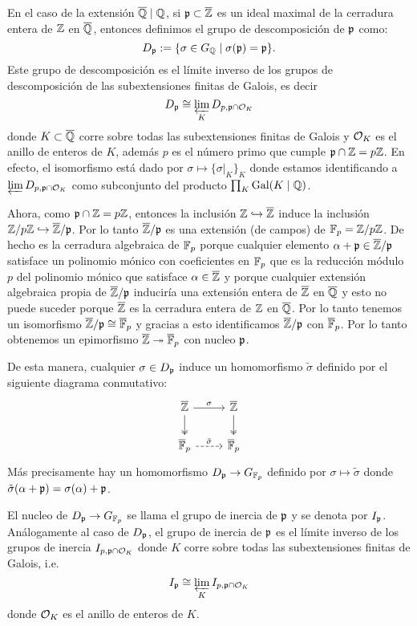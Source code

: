 En el caso de la extensi\'on $\overline{\mathbb{Q}}\mid\mathbb{Q}$, si $\mathfrak{p}\subset\overline{\mathbb{Z}}$ es un ideal maximal de la cerradura entera de $\mathbb{Z}$ en $\overline{\mathbb{Q}}$, entonces definimos el grupo de descomposici\'on de $\mathfrak{p}$ como:
\[
  D_{\mathfrak{p}}:=\{\sigma\in G_{\mathbb{Q}}\mid \sigma(\mathfrak{p})=\mathfrak{p}\}.
\]
Este grupo de descomposici\'on es el l\'imite inverso de los grupos de descomposici\'on de las subextensiones finitas de Galois, es decir
\[
  D_{\mathfrak{p}}\cong \varprojlim_{K}D_{p,\mathfrak{p}\cap\mathcal{O}_K}
\]
donde $K\subset\overline{\mathbb{Q}}$ corre sobre todas las subextensiones finitas de Galois y $\mathcal{O}_K$ es el anillo de enteros de $K$, adem\'as $p$ es el n\'umero primo que cumple $\mathfrak{p}\cap\mathbb{Z}=p\mathbb{Z}$. En efecto, el isomorfismo est\'a dado por $\sigma\mapsto \{\sigma|_K\}_{K}$ donde estamos identificando a $\varprojlim D_{p,\mathfrak{p}\cap\mathcal{O}_K}$ como subconjunto del producto $\prod_K\text{Gal}(K\mid\mathbb{Q})$.

Ahora, como $\mathfrak{p}\cap\mathbb{Z}=p\mathbb{Z}$, entonces la inclusi\'on $\mathbb{Z}\hookrightarrow\overline{\mathbb{Z}}$ induce la inclusi\'on $\mathbb{Z}/p\mathbb{Z} \hookrightarrow\overline{\mathbb{Z}}/\mathfrak{p}$. Por lo tanto $\overline{\mathbb{Z}}/\mathfrak{p}$ es una extensi\'on (de campos) de $\mathbb{F}_p=\mathbb{Z}/p\mathbb{Z}$. De hecho es la cerradura algebraica de $\mathbb{F}_p$ porque cualquier elemento $\alpha+\mathfrak{p}\in\overline{\mathbb{Z}}/\mathfrak{p}$ satisface un polinomio m\'onico con coeficientes en $\mathbb{F}_p$ que es la reducci\'on m\'odulo $p$ del polinomio m\'onico que satisface $\alpha\in\overline{\mathbb{Z}}$ y porque cualquier extensi\'on algebraica propia de $\overline{\mathbb{Z}}/\mathfrak{p}$ inducir\'ia una extensi\'on entera de $\overline{\mathbb{Z}}$ en $\overline{\mathbb{Q}}$ y esto no puede suceder porque $\overline{\mathbb{Z}}$ es la cerradura entera de $\mathbb{Z}$ en $\overline{\mathbb{Q}}$. Por lo tanto tenemos un isomorfismo $\overline{\mathbb{Z}}/\mathfrak{p}\cong\overline{\mathbb{F}}_p$ y gracias a esto identificamos $\overline{\mathbb{Z}}/\mathfrak{p}$ con $\overline{\mathbb{F}}_p$. Por lo tanto obtenemos un epimorfismo $\overline{\mathbb{Z}}\twoheadrightarrow\overline{\mathbb{F}}_p$ con nucleo $\mathfrak{p}$.

De esta manera, cualquier $\sigma\in D_{\mathfrak{p}}$ induce un homomorfismo $\tilde{\sigma}$ definido por el siguiente diagrama conmutativo:
\[
  \begin{tikzcd}
    \ol{\ZZ} \arrow[d,two heads] \arrow[r,"\sigma"] & \ol{\ZZ} \arrow[d,two heads]\\
    \ol{\FF}_p \arrow[r,dashed,"\tilde{\sigma}"]& \ol{\FF}_p
  \end{tikzcd}
\]
M\'as precisamente hay un homomorfismo $D_{\mathfrak{p}}\rightarrow G_{\mathbb{F}_p}$ definido por $\sigma\mapsto\tilde{\sigma}$ donde $\tilde{\sigma}(\alpha+\mathfrak{p})=\sigma(\alpha)+\mathfrak{p}$.

El nucleo de $D_{\mathfrak{p}}\rightarrow G_{\mathbb{F}_p}$ se llama el grupo de inercia de $\mathfrak{p}$ y se denota por $I_{\mathfrak{p}}$. An\'alogamente al caso de $D_{\mathfrak{p}}$, el grupo de inercia de $\mathfrak{p}$ es el l\'imite inverso de los grupos de inercia $I_{p,\mathfrak{p}\cap\mathcal{O}_K}$ donde $K$ corre sobre todas las subextensiones finitas de Galois, i.e.
\[
  I_{\mathfrak{p}}\cong\varprojlim_K I_{p,\mathfrak{p}\cap\mathcal{O}_K}
\]
donde $\mathcal{O}_K$ es el anillo de enteros de $K$.

